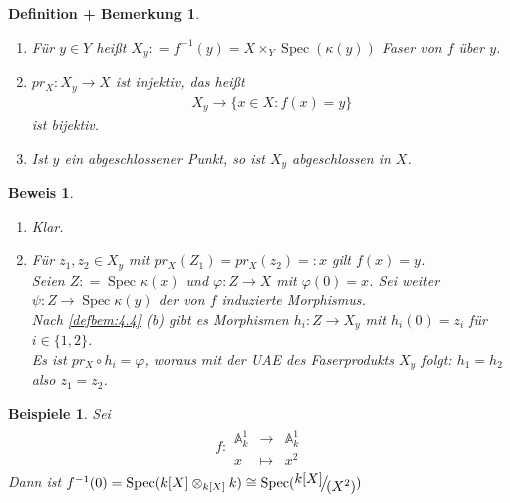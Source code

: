 \documentclass[a4paper,oneside]{scrbook}
\theoremstyle{break}
\newtheorem{DefBem}[Def]{Definition + Bemerkung}
\theoremstyle{nonumberbreak}
\newtheorem{nnBsp}{Beispiele}
\theoremstyle{nonumberplain}
\newtheorem{Bew}{Beweis}
\theoremstyle{break}
\newcommand{\defeqr}[0]{\mathrel{\mathop:}=}
\newcommand{\defeql}[0]{=\mathrel{\mathop:}}
\newcommand{\Abb}[5]{\ensuremath{#1:\begin{array}{ccc} #2 & \longrightarrow & #3 \\ #4 & \longmapsto & #5 \end{array}}}
\newcommand{\Spec}{%
	\ensuremath{\operatorname{Spec}}%
}
\newcommand{\FakRaum}[2]{
  \raisebox{0.7ex}{\ensuremath{#1}}
  \ensuremath{\mkern-3mu}\big/\ensuremath{\mkern-3mu}
  \raisebox{-0.6ex}{\ensuremath{#2}}}
\begin{document}
\begin{DefBem}
  \label{defbem:5.3}
  \begin{enumerate}
  \item Für $y\in Y$ heißt $X_y\defeqr f^{-1}(y)=X\times_Y\Spec(\kappa(y))$ \emph{Faser} von $f$ über $y$.
  \item $pr_X:X_y\to X$ ist injektiv, das heißt
    \begin{align*}
      X_y\to \{x\in X:f(x)=y\}
    \end{align*}
    ist bijektiv.
  \item Ist $y$ ein abgeschlossener Punkt, so ist $X_y$ abgeschlossen in $X$. 
  \end{enumerate}
\end{DefBem}

\begin{Bew}
  \begin{enumerate}
  \item[(c)] Klar.
  \item[(b)] Für $z_1,z_2\in X_y$ mit $pr_X(Z_1)=pr_X(z_2)\defeql x$ gilt $f(x)=y$.\\
    Seien $Z\defeqr\Spec\kappa(x)$ und $\varphi:Z\to X$ mit $\varphi(0)=x$. Sei weiter $\psi:Z\to\Spec\kappa(y)$
    der von $f$ induzierte Morphismus. \\
    Nach \ref{defbem:4.4} (b) gibt es Morphismen $h_i:Z\to X_y$
    mit $h_i(0)=z_i$ für $i\in\{1,2\}$. \\
    Es ist $pr_X\circ h_i=\varphi$, woraus mit der UAE des Faserprodukts $X_y$ folgt: $h_1=h_2$ also $z_1=z_2$.
  \end{enumerate}
\end{Bew}

\begin{nnBsp}
  Sei
  \begin{align*}
    \Abb{f}{\mathbb A_k^1}{\mathbb A_k^1}{x}{x^2}
  \end{align*}
  Dann ist $f^{-1}(0)=\Spec(k[X]\otimes_{k[X]}k)\cong\Spec(\FakRaum{k[X]}{(X^2)})$
\end{nnBsp}
\end{document}
